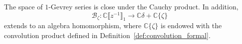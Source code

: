 \documentclass{article}
\newcommand{\C}{\mathbb{C}}
\newcommand{\series}[1]{\tilde{#1}}
\newcommand{\borel}{\mathcal{B}}
\theoremstyle{definition}
\newtheorem{definition}{Definition}[section]
\theoremstyle{plain}
\newtheorem{lemma}[definition]{Lemma}
\begin{document}
The space of $1$-Gevrey series is close under the Cauchy product. In addition, 
\[\borel_\zeta\colon\C\llbracket z^{-1}\rrbracket_1\to\C\delta + \C\{\zeta\}\]
extends to an algebra homomorphism, where $\C\{\zeta\}$ is endowed with the convolution product defined in Definition~\ref{def:convolution_formal}. 
\end{document}
